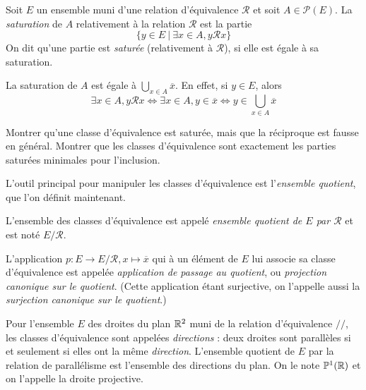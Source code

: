\begin{definition}
Soit $E$ un ensemble muni d'une relation d'équivalence ${\mathcal R}$ et soit $A\in \mathcal P(E)$. La \emph{saturation} de $A$ relativement à la relation $\mathcal R$ est la partie
\[
\{y\in E\:|\: \exists x\in A, y\mathcal R x\} 
\]
On dit qu'une partie est \emph{saturée} (relativement à $\mathcal R$), si elle est égale à sa saturation.
\end{definition}

\begin{remarque} La saturation de $A$ est égale à $\bigcup_{x\in A} \overline x$. En effet, si $y\in E$, alors 
\[
\exists x\in A, y\mathcal R x
\iff \exists x\in A, y\in \overline x
\iff y\in \bigcup_{x\in A} \overline x 
\]
\end{remarque}

\begin{exercice} Montrer qu'une classe d'équivalence est saturée, mais que la réciproque est fausse en général. Montrer que les classes d'équivalence sont exactement les parties saturées minimales pour l'inclusion.
\end{exercice}

L'outil principal pour manipuler les classes d'équivalence est l'\emph{ensemble quotient}, que l'on définit maintenant.

\begin{definition}

L'ensemble des classes d'équivalence est appelé \emph{ensemble quotient de $E$ par $\mathcal R$} et est noté $E/{\mathcal R}$.

L'application $p : E \to E/\mathcal R, x\mapsto \overline{x}$ qui à un élément de $E$ lui associe sa classe d'équivalence est appelée \emph{application de passage au quotient}, ou \emph{projection canonique sur le quotient}. (Cette application étant surjective, on l'appelle aussi la \emph{surjection canonique sur le quotient}.)
\end{definition}

\begin{exemple}
Pour l'ensemble $E$ des droites du plan $\mathbb{R}^2$ muni de la relation d'équivalence $//$, les classes d'équivalence sont appelées \emph{directions} : deux droites sont parallèles si et seulement si elles ont la même \emph{direction}. L'ensemble quotient de $E$ par la relation de parallélisme est l'ensemble des directions du plan. On le note $\mathbb{P}^1(\mathbb{R})$ et on l'appelle la droite projective.
\end{exemple}

